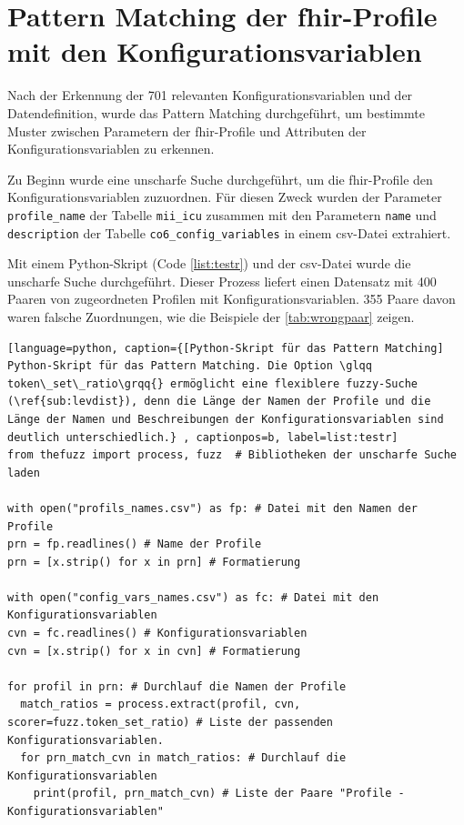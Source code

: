 \section{Pattern Matching der \acs{fhir}-Profile mit den Konfigurationsvariablen} \label{sec:pattmach}

Nach der Erkennung der 701 relevanten Konfigurationsvariablen und der Datendefinition, wurde das Pattern Matching durchgeführt, um bestimmte Muster zwischen Parametern der \ac{fhir}-Profile und Attributen der Konfigurationsvariablen zu erkennen. 

Zu Beginn wurde eine unscharfe Suche durchgeführt, um die \ac{fhir}-Profile den Konfigurationsvariablen zuzuordnen. Für diesen Zweck wurden der Parameter \texttt{profile\_name} der Tabelle \texttt{mii\_icu} zusammen mit den Parametern \texttt{name} und \texttt{description} der Tabelle \texttt{co6\_config\_variables} in einem \ac{csv}-Datei extrahiert. 

Mit einem Python-Skript (Code \ref{list:testr}) und der \ac{csv}-Datei wurde die unscharfe Suche durchgeführt. Dieser Prozess liefert einen Datensatz mit 400 Paaren von zugeordneten Profilen mit Konfigurationsvariablen. 355 Paare davon waren falsche Zuordnungen, wie die Beispiele der \ref{tab:wrongpaar} zeigen.

\begin{lstlisting}[language=python, caption={[Python-Skript für das Pattern Matching] Python-Skript für das Pattern Matching. Die Option \glqq token\_set\_ratio\grqq{} ermöglicht eine flexiblere fuzzy-Suche (\ref{sub:levdist}), denn die Länge der Namen der Profile und die Länge der Namen und Beschreibungen der Konfigurationsvariablen sind deutlich unterschiedlich.} , captionpos=b, label=list:testr]
from thefuzz import process, fuzz  # Bibliotheken der unscharfe Suche laden

with open("profils_names.csv") as fp: # Datei mit den Namen der Profile
prn = fp.readlines() # Name der Profile
prn = [x.strip() for x in prn] # Formatierung

with open("config_vars_names.csv") as fc: # Datei mit den Konfigurationsvariablen
cvn = fc.readlines() # Konfigurationsvariablen
cvn = [x.strip() for x in cvn] # Formatierung

for profil in prn: # Durchlauf die Namen der Profile
  match_ratios = process.extract(profil, cvn, scorer=fuzz.token_set_ratio) # Liste der passenden Konfigurationsvariablen.
  for prn_match_cvn in match_ratios: # Durchlauf die Konfigurationsvariablen
    print(profil, prn_match_cvn) # Liste der Paare "Profile - Konfigurationsvariablen"
   
\end{lstlisting}


